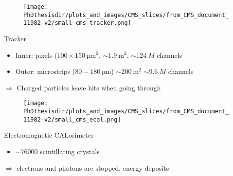 \begin{frame}
\addtocounter{framenumber}{-1}
\transdissolve
\begin{minipage}[t]{.6\textwidth}
\begin{figure}
\texttt{[image: \\PhDthesisdir/plots\_and\_images/CMS\_slices/from\_CMS\_document\_11982-v2/small\_cms\_tracker.png]}
\end{figure}
\end{minipage}
\hfill\begin{minipage}[t]{.35\textwidth}
\begin{block}{Tracker}
\begin{itemize}
\item Inner: pixels ($\num{100}\times\SI{150}{\micro\meter^2}$, $\sim\SI{1.9}{\meter^2}$, $\sim\SI{124}{M}$ channels
\item Outer: microstrips ($\num{80}-\SI{180}{\micro\meter}$) $\sim\SI{200}{\meter^2}$ $\sim\SI{9.6}{M}$ channels
\end{itemize}
\end{block}

\begin{block}{}
$\Rightarrow$ Charged particles leave hits when going through
\end{block}
\end{minipage}
\end{frame}

\begin{frame}
\addtocounter{framenumber}{-1}
\transdissolve
\begin{minipage}[t]{.6\textwidth}
\begin{figure}
\texttt{[image: \\PhDthesisdir/plots\_and\_images/CMS\_slices/from\_CMS\_document\_11982-v2/small\_cms\_ecal.png]}
\end{figure}
\end{minipage}
\hfill\begin{minipage}[t]{.35\textwidth}
\begin{block}{Electromagnetic CALorimeter}
\begin{itemize}
\item $\sim\num{76000}$ scintillating  crystals
\end{itemize}
\end{block}

\begin{block}{}
$\Rightarrow$ electrons and photons are stopped, energy deposits
\end{block}
\end{minipage}
\end{frame}

